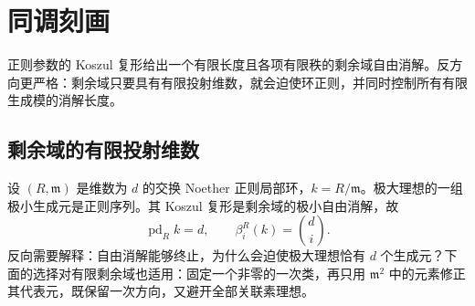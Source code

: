 
\section{同调刻画}
\label{b3:sec:1802}

正则参数的 Koszul 复形给出一个有限长度且各项有限秩的剩余域自由消解。反方向更严格：剩余域只要具有有限投射维数，就会迫使环正则，并同时控制所有有限生成模的消解长度。

%
%

\subsection{剩余域的有限投射维数}
\label{b3:subsec:1802:01}

设 \((R,\mathfrak m)\) 是维数为 \(d\) 的交换 Noether 正则局部环，\(k=R/\mathfrak m\)。极大理想的一组极小生成元是正则序列。其 Koszul 复形是剩余域的极小自由消解，故
\begin{equation}\label{b3:eq:regular-residue-betti}
	\operatorname{pd}_Rk=d,\qquad \beta_i^R(k)=\binom di.
\end{equation}
反向需要解释：自由消解能够终止，为什么会迫使极大理想恰有 \(d\) 个生成元？下面的选择对有限剩余域也适用：固定一个非零的一次类，再只用 \(\mathfrak m^2\) 中的元素修正其代表元，既保留一次方向，又避开全部关联素理想。

